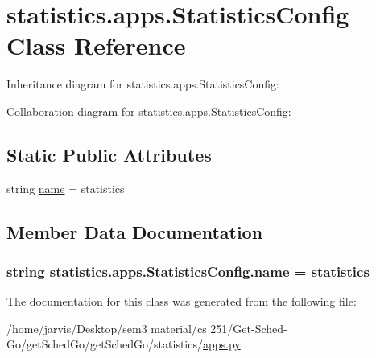 \hypertarget{classstatistics_1_1apps_1_1StatisticsConfig}{}\section{statistics.\+apps.\+Statistics\+Config Class Reference}
\label{classstatistics_1_1apps_1_1StatisticsConfig}


Inheritance diagram for statistics.\+apps.\+Statistics\+Config\+:


Collaboration diagram for statistics.\+apps.\+Statistics\+Config\+:
\subsection*{Static Public Attributes}
\begin{DoxyCompactItemize}
\item 
string \hyperlink{classstatistics_1_1apps_1_1StatisticsConfig_aa1f07cd3b57a9bb18ab2fd41fd937af6}{name} = \textquotesingle{}statistics\textquotesingle{}
\end{DoxyCompactItemize}


\subsection{Member Data Documentation}
\subsubsection[{\texorpdfstring{name}{name}}]{\setlength{\rightskip}{0pt plus 5cm}string statistics.\+apps.\+Statistics\+Config.\+name = \textquotesingle{}statistics\textquotesingle{}\hspace{0.3cm}{\ttfamily [static]}}\hypertarget{classstatistics_1_1apps_1_1StatisticsConfig_aa1f07cd3b57a9bb18ab2fd41fd937af6}{}\label{classstatistics_1_1apps_1_1StatisticsConfig_aa1f07cd3b57a9bb18ab2fd41fd937af6}


The documentation for this class was generated from the following file\+:\begin{DoxyCompactItemize}
\item 
/home/jarvis/\+Desktop/sem3 material/cs 251/\+Get-\/\+Sched-\/\+Go/get\+Sched\+Go/get\+Sched\+Go/statistics/\hyperlink{statistics_2apps_8py}{apps.\+py}\end{DoxyCompactItemize}
